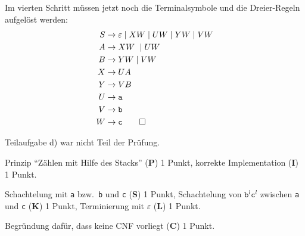 \begin{loesung}
\begin{teilaufgaben}
{Im vierten Schritt müssen jetzt noch die Terminalsymbole und die 
Dreier-Regeln aufgelöst werden:
\begin{align*}
S&\rightarrow \varepsilon \;|\; XW \;|\; UW \;|\; YW \;|\; VW \\
A&\rightarrow X W \;|\; UW \\
B&\rightarrow YW \;|\; VW \\
X&\rightarrow UA \\
Y&\rightarrow VB \\
U&\rightarrow \texttt{a} \\
V&\rightarrow \texttt{b} \\
W&\rightarrow \texttt{c}
\qedhere
\end{align*}
}
\end{teilaufgaben}
\end{loesung}

\begin{diskussion}
Teilaufgabe d) war nicht Teil der Prüfung.
\end{diskussion}

\begin{bewertung}
\begin{teilaufgaben}
\item Prinzip ``Zählen mit Hilfe des Stacks'' ({\bf P}) 1 Punkt,
korrekte Implementation ({\bf I}) 1 Punkt.
\item 
Schachtelung mit \texttt{a} bzw.~\texttt{b} und \texttt{c} ({\bf S}) 1 Punkt,
Schachtelung von $\texttt{b}^l\texttt{c}^l$ zwischen \texttt{a} und \texttt{c}
({\bf K}) 1 Punkt,
Terminierung mit $\varepsilon$ ({\bf L}) 1 Punkt.
\item
Begründung dafür, dass keine CNF vorliegt ({\bf C}) 1 Punkt.
\end{teilaufgaben}
\end{bewertung}
